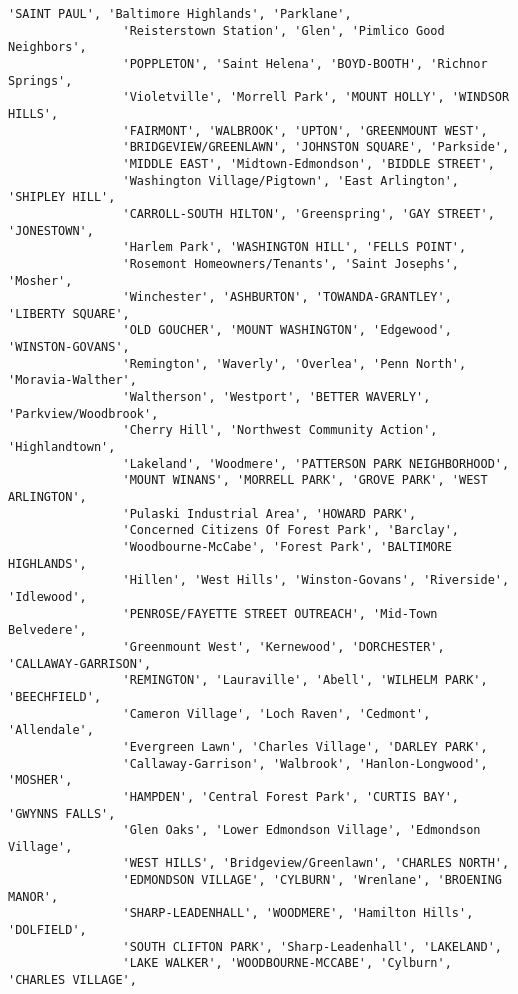 \documentclass[11pt]{article}
\begin{document}
\begin{Verbatim}[commandchars=\\\{\}]
                'SAINT PAUL', 'Baltimore Highlands', 'Parklane',
                'Reisterstown Station', 'Glen', 'Pimlico Good Neighbors',
                'POPPLETON', 'Saint Helena', 'BOYD-BOOTH', 'Richnor Springs',
                'Violetville', 'Morrell Park', 'MOUNT HOLLY', 'WINDSOR HILLS',
                'FAIRMONT', 'WALBROOK', 'UPTON', 'GREENMOUNT WEST',
                'BRIDGEVIEW/GREENLAWN', 'JOHNSTON SQUARE', 'Parkside',
                'MIDDLE EAST', 'Midtown-Edmondson', 'BIDDLE STREET',
                'Washington Village/Pigtown', 'East Arlington', 'SHIPLEY HILL',
                'CARROLL-SOUTH HILTON', 'Greenspring', 'GAY STREET', 'JONESTOWN',
                'Harlem Park', 'WASHINGTON HILL', 'FELLS POINT',
                'Rosemont Homeowners/Tenants', 'Saint Josephs', 'Mosher',
                'Winchester', 'ASHBURTON', 'TOWANDA-GRANTLEY', 'LIBERTY SQUARE',
                'OLD GOUCHER', 'MOUNT WASHINGTON', 'Edgewood', 'WINSTON-GOVANS',
                'Remington', 'Waverly', 'Overlea', 'Penn North', 'Moravia-Walther',
                'Waltherson', 'Westport', 'BETTER WAVERLY', 'Parkview/Woodbrook',
                'Cherry Hill', 'Northwest Community Action', 'Highlandtown',
                'Lakeland', 'Woodmere', 'PATTERSON PARK NEIGHBORHOOD',
                'MOUNT WINANS', 'MORRELL PARK', 'GROVE PARK', 'WEST ARLINGTON',
                'Pulaski Industrial Area', 'HOWARD PARK',
                'Concerned Citizens Of Forest Park', 'Barclay',
                'Woodbourne-McCabe', 'Forest Park', 'BALTIMORE HIGHLANDS',
                'Hillen', 'West Hills', 'Winston-Govans', 'Riverside', 'Idlewood',
                'PENROSE/FAYETTE STREET OUTREACH', 'Mid-Town Belvedere',
                'Greenmount West', 'Kernewood', 'DORCHESTER', 'CALLAWAY-GARRISON',
                'REMINGTON', 'Lauraville', 'Abell', 'WILHELM PARK', 'BEECHFIELD',
                'Cameron Village', 'Loch Raven', 'Cedmont', 'Allendale',
                'Evergreen Lawn', 'Charles Village', 'DARLEY PARK',
                'Callaway-Garrison', 'Walbrook', 'Hanlon-Longwood', 'MOSHER',
                'HAMPDEN', 'Central Forest Park', 'CURTIS BAY', 'GWYNNS FALLS',
                'Glen Oaks', 'Lower Edmondson Village', 'Edmondson Village',
                'WEST HILLS', 'Bridgeview/Greenlawn', 'CHARLES NORTH',
                'EDMONDSON VILLAGE', 'CYLBURN', 'Wrenlane', 'BROENING MANOR',
                'SHARP-LEADENHALL', 'WOODMERE', 'Hamilton Hills', 'DOLFIELD',
                'SOUTH CLIFTON PARK', 'Sharp-Leadenhall', 'LAKELAND',
                'LAKE WALKER', 'WOODBOURNE-MCCABE', 'Cylburn', 'CHARLES VILLAGE',

\end{Verbatim}
\end{document}
